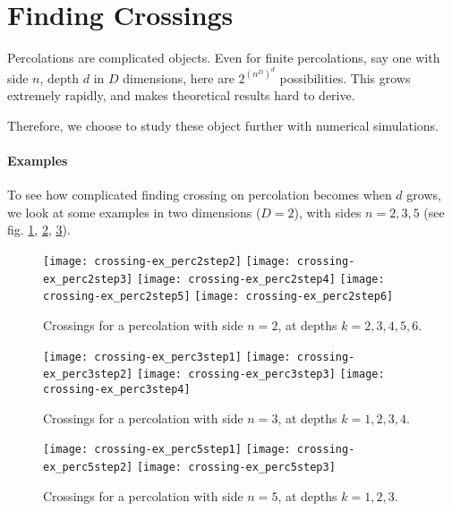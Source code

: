 \section{Finding Crossings}
Percolations are complicated objects.
Even for finite percolations, say one with side $n$, depth $d$ in $D$ dimensions, here are $2^{\left( n^D \right)^d}$ possibilities.
This grows extremely rapidly, and makes theoretical results hard to derive.

Therefore, we choose to study these object further with numerical simulations.

\paragraph{Examples}
To see how complicated finding crossing on percolation becomes when $d$ grows, we look at some examples in two dimensions ($D=2$), with sides $n=2,3,5$ (see fig. \ref{fig:crossingExPerc2}, \ref{fig:crossingExPerc3}, \ref{fig:crossingExPerc5}).
\begin{figure}[!h]
	\texttt{[image: crossing-ex\_perc2step2]}
	\hspace{0.1cm}
	\texttt{[image: crossing-ex\_perc2step3]}
	\hspace{0.1cm}
	\texttt{[image: crossing-ex\_perc2step4]}
	\hspace{0.1cm}
	\texttt{[image: crossing-ex\_perc2step5]}
	\hspace{0.1cm}
	\texttt{[image: crossing-ex\_perc2step6]}
	\centering
	\caption{Crossings for a percolation with side $n=2$, at depths $k=2,3,4,5,6$.}
	\label{fig:crossingExPerc2}
\end{figure}
\begin{figure}[!h]
	\texttt{[image: crossing-ex\_perc3step1]}
	\hspace{0.1cm}
	\texttt{[image: crossing-ex\_perc3step2]}
	\hspace{0.1cm}
	\texttt{[image: crossing-ex\_perc3step3]}
	\hspace{0.1cm}
	\texttt{[image: crossing-ex\_perc3step4]}
	\centering
	\caption{Crossings for a percolation with side $n=3$, at depths $k=1,2,3,4$.}
	\label{fig:crossingExPerc3}
\end{figure}
\begin{figure}[!h]
	\texttt{[image: crossing-ex\_perc5step1]}
	\hspace{0.9cm}
	\texttt{[image: crossing-ex\_perc5step2]}
	\hspace{0.9cm}
	\texttt{[image: crossing-ex\_perc5step3]}
	\centering
	\caption{Crossings for a percolation with side $n=5$, at depths $k=1,2,3$.}
	\label{fig:crossingExPerc5}
\end{figure}


